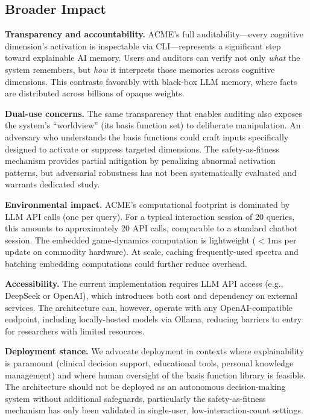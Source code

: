 \documentclass[review]{elsarticle}
\begin{document}
\subsection{Broader Impact}

\textbf{Transparency and accountability.} ACME's full auditability---every
cognitive dimension's activation is inspectable via CLI---represents a
significant step toward explainable AI memory. Users and auditors can verify
not only \emph{what} the system remembers, but \emph{how} it interprets those
memories across cognitive dimensions. This contrasts favorably with black-box
LLM memory, where facts are distributed across billions of opaque weights.

\textbf{Dual-use concerns.} The same transparency that enables auditing also
exposes the system's ``worldview'' (its basis function set) to deliberate
manipulation. An adversary who understands the basis functions could craft
inputs specifically designed to activate or suppress targeted dimensions.
The safety-as-fitness mechanism provides partial mitigation by penalizing
abnormal activation patterns, but adversarial robustness has not been
systematically evaluated and warrants dedicated study.

\textbf{Environmental impact.} ACME's computational footprint is dominated by
LLM API calls (one per query). For a typical interaction session of 20 queries,
this amounts to approximately 20 API calls, comparable to a standard chatbot
session. The embedded game-dynamics computation is lightweight ($<1$ms per
update on commodity hardware). At scale, caching frequently-used spectra and
batching embedding computations could further reduce overhead.

\textbf{Accessibility.} The current implementation requires LLM API access
(e.g., DeepSeek or OpenAI), which introduces both cost and dependency on
external services. The architecture can, however, operate with any
OpenAI-compatible endpoint, including locally-hosted models via Ollama,
reducing barriers to entry for researchers with limited resources.

\textbf{Deployment stance.} We advocate deployment in contexts where
explainability is paramount (clinical decision support, educational tools,
personal knowledge management) and where human oversight of the basis
function library is feasible. The architecture should not be deployed as an
autonomous decision-making system without additional safeguards, particularly
the safety-as-fitness mechanism has only been validated in single-user,
low-interaction-count settings.
\end{document}
